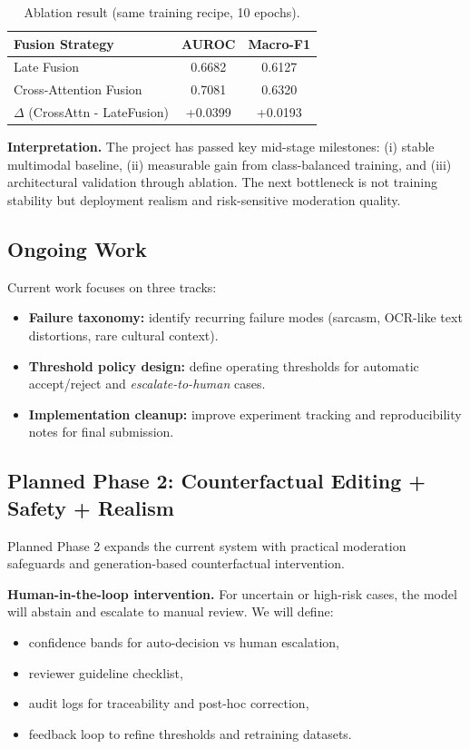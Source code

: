 \documentclass[11pt]{article}
\begin{document}
\begin{table}[h]
\centering
\small
\caption{Ablation result (same training recipe, 10 epochs).}
\begin{tabular}{lcc}
\toprule
Fusion Strategy & AUROC & Macro-F1 \\
\midrule
Late Fusion & 0.6682 & 0.6127 \\
Cross-Attention Fusion & 0.7081 & 0.6320 \\
\midrule
\(\Delta\) (CrossAttn - LateFusion) & +0.0399 & +0.0193 \\
\bottomrule
\end{tabular}
\label{tab:ablation}
\end{table}

\textbf{Interpretation.}
The project has passed key mid-stage milestones: (i) stable multimodal baseline, (ii) measurable gain from class-balanced training, and (iii) architectural validation through ablation. The next bottleneck is not training stability but deployment realism and risk-sensitive moderation quality.

\subsection{Ongoing Work}
Current work focuses on three tracks:
\begin{itemize}[leftmargin=*]
  \item \textbf{Failure taxonomy:} identify recurring failure modes (sarcasm, OCR-like text distortions, rare cultural context).
  \item \textbf{Threshold policy design:} define operating thresholds for automatic accept/reject and \emph{escalate-to-human} cases.
  \item \textbf{Implementation cleanup:} improve experiment tracking and reproducibility notes for final submission.
\end{itemize}

\subsection{Planned Phase 2: Counterfactual Editing + Safety + Realism}
Planned Phase 2 expands the current system with practical moderation safeguards and generation-based counterfactual intervention.

\textbf{Human-in-the-loop intervention.}
For uncertain or high-risk cases, the model will abstain and escalate to manual review. We will define:
\begin{itemize}[leftmargin=*,nosep]
  \item confidence bands for auto-decision vs human escalation,
  \item reviewer guideline checklist,
  \item audit logs for traceability and post-hoc correction,
  \item feedback loop to refine thresholds and retraining datasets.
\end{itemize}
\end{document}
